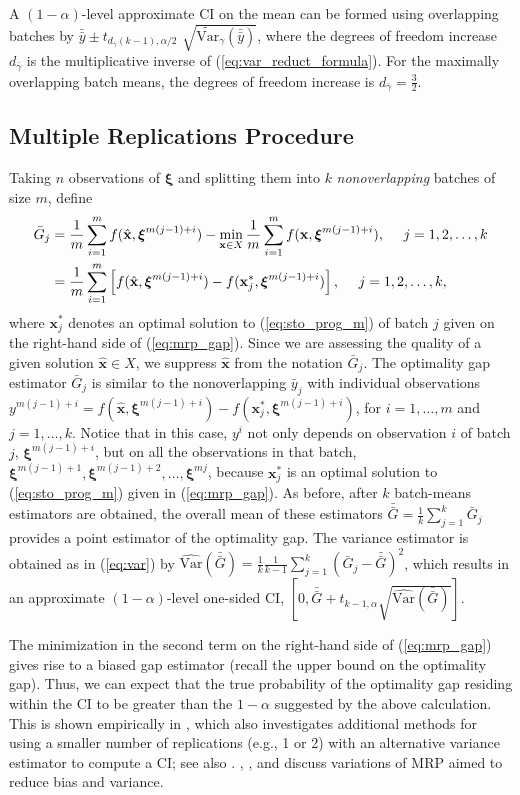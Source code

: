 \documentclass[12pt]{article}
\newcommand{\vartg}[1]{\widetilde{\mathrm{Var}}_\gamma \left( #1 \right)}
\newcommand{\varhat}{\widehat{\mathrm{Var}}}
\newcommand{\X}{X}
\newcommand{\x}{\mathbf{x}}
\newcommand{\xh}{{\hat{\x}}}
\newcommand{\xs}{\x^*}
\newcommand{\xit}{\boldsymbol{\xi}}
\newcommand{\gammab}{\bar{\gamma}}
\newcommand{\gb}{\bar{G}}
\newcommand{\gbb}{\bar{\gb}}
\newcommand{\yb}{\bar{y}}
\newcommand{\ybb}{\bar{\yb}}
\begin{document}
A $(1-\alpha)$-level approximate CI on the mean can be formed using overlapping batches by $\ybb \pm t_{d_{\gammab}(k-1),\alpha/2}$ $\sqrt{\vartg{\ybb}}$, where the degrees of freedom increase $d_{\gammab}$ is the multiplicative inverse of (\ref{eq:var_reduct_formula}).  
For the maximally overlapping batch means, the degrees of freedom increase is $d_{\gammab} = \frac{3}{2}$.

 
\subsection{Multiple Replications Procedure} 
\label{ssec:mrp}

Taking $n$ observations of $\xit$ and splitting them into $k$ {\it nonoverlapping} batches of size $m$, define
\begin{align} 
	\gb_j  & = \frac{1}{m} \sum_{i = 1}^{m} f(\xh, \xit^{m(j-1)+i}) - \min_{\x \in X} \frac{1}{m} \sum_{i=1}^{m} f(\x, \xit^{m(j-1)+i}), \ \ \ \ j = 1,2, \dots, k \label{eq:mrp_gap}\\
         & = \frac{1}{m} \sum_{i = 1}^{m} \left[ f(\xh, \xit^{m(j-1)+i}) -  f(\xs_j, \xit^{m(j-1)+i}) \right], \ \ \ \ j = 1,2, \dots, k, \notag
\end{align}
where $\xs_j$ denotes an optimal solution to (\ref{eq:sto_prog_m}) of batch $j$ given on the right-hand side of (\ref{eq:mrp_gap}).    
Since we are assessing the quality of a given solution $\xh \in \X$, we suppress $\xh$ from the notation $\gb_j$.
The optimality gap estimator $\gb_j$ is similar to the nonoverlapping $\yb_j$ with individual observations $y^{m(j-1)+i} = f(\xh,\xit^{m(j-1)+i}) - f(\xs_j,\xit^{m(j-1)+i})$, for $i=1,\ldots,m$ and $j=1,\ldots, k$.
Notice that in this case, $y^i$ not only depends on observation $i$ of batch $j$, $\xit^{m(j-1)+i}$, but on all the observations in that batch,  $\xit^{m(j-1)+1},\xit^{m(j-1)+2},\ldots,\xit^{mj}$, because $\xs_j$ is an optimal solution to (\ref{eq:sto_prog_m}) given in (\ref{eq:mrp_gap}).   
As before, after $k$ batch-means estimators are obtained, the overall mean of these estimators $\gbb = \frac{1}{k} \sum_{j=1}^k \gb_j$ provides a point estimator of the optimality gap.  
The variance estimator is obtained as in (\ref{eq:var}) by $\varhat(\gbb) = \frac{1}{k} \frac{1}{k-1} \sum_{j=1}^k (\gb_j - \gbb)^2$, which results in an approximate $(1-\alpha)$-level one-sided CI, $\left[0, \gbb + t_{k-1,\alpha} \sqrt{\varhat(\gbb)} \right]$.

The minimization in the second term on the right-hand side of (\ref{eq:mrp_gap}) gives rise to a biased gap estimator (recall the upper bound on the optimality gap).  
Thus, we can expect that the true probability of the optimality gap residing within the CI to be greater than the $1 - \alpha$ suggested by the above calculation.  
This is shown empirically in \cite{Bayraksan2006}, which also investigates additional methods for using a smaller number of replications (e.g., 1 or 2) with an alternative variance estimator to compute a CI; see also \cite{stockbridge_bayraksan_13}. 
\cite{bayraksan_morton_09}, \cite{partani2006jackknife}, and \cite{partani_07} discuss variations of MRP aimed to reduce bias and variance.
\end{document}
